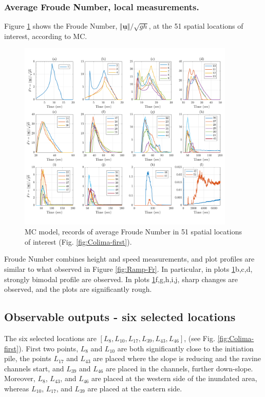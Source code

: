 \documentclass{article}
\begin{document}
\subsubsection{Average Froude Number, local measurements.}
Figure \ref{fig:BAF-Fr-MC} shows the Froude Number, $\Vert \underline{\mathbf{u}} \Vert/\sqrt{gh}$, at the 51 spatial locations of interest, according to MC.
\begin{figure}[H]
         \centering
        \includegraphics[width=0.92\textwidth]{MC&VS_51/Froude_MC2.png}
        \caption{MC model, records of average Froude Number in 51 spatial locations of interest (Fig. \ref{fig:Colima-first}).}
        \label{fig:BAF-Fr-MC}
\end{figure}
Froude Number combines height and speed measurements, and plot profiles are similar to what observed in Figure \ref{fig:Ramp-Fr}. In particular, in plots \ref{fig:BAF-Fr-MC}b,c,d, strongly bimodal profile are observed. In plots \ref{fig:BAF-Fr-MC}f,g,h,i,j, sharp changes are observed, and the plots are significantly rough.

\subsection{Observable outputs - six selected locations}\label{Obs2}
The six selected locations are $[L_8, L_{10}, L_{17}, L_{39}, L_{43}, L_{46}]$, (see Fig. \ref{fig:Colima-first}). First two points, $L_8$ and $L_{10}$ are both significantly close to the initiation pile, the points $L_{17}$ and $L_{43}$ are placed where the slope is reducing and the ravine channels start, and $L_{39}$ and $L_{46}$ are placed in the channels, further down-slope. Moreover, $L_8$, $L_{43}$, and $L_{46}$ are placed at the western side of the inundated area, whereas $L_{10}$, $L_{17}$, and $L_{39}$ are placed at the eastern side.
\end{document}
